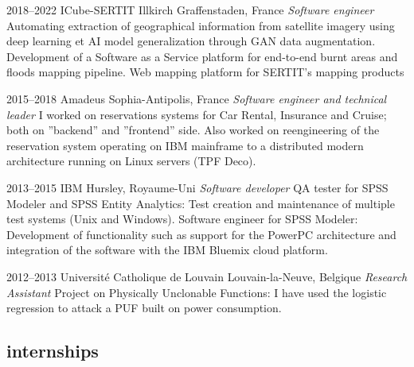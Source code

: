 \documentclass[]{friggeri-cv} %
\begin{document}
\begin{entrylist}



\entry
{2018--2022}
{ICube-SERTIT}
{Illkirch Graffenstaden, France}
{\emph{Software engineer}
\medbreak
Automating extraction of geographical information from satellite imagery
using deep learning et AI model generalization through GAN data augmentation.
\smallbreak
Development of a Software as a Service platform for end-to-end burnt areas
and floods mapping pipeline.
\smallbreak
Web mapping platform for SERTIT's mapping products
}

\entry
{2015--2018}
{Amadeus}
{Sophia-Antipolis, France}
{\emph{Software engineer and technical leader}
\medbreak
I worked on reservations systems for Car Rental, Insurance and Cruise; both
on ”backend” and ”frontend” side.
\smallbreak
Also worked on reengineering of the reservation system operating on IBM
mainframe to a distributed modern architecture running on Linux servers
(TPF Deco).
\bigbreak %
}

\entry
{2013--2015}
{IBM}
{Hursley, Royaume-Uni}
{\emph{Software developer}
\medbreak
QA tester for SPSS Modeler and SPSS Entity Analytics: Test creation and
maintenance of multiple test systems (Unix and Windows).
\smallbreak
Software engineer for SPSS Modeler: Development of functionality such as
support for the PowerPC architecture and integration of the software with
the IBM Bluemix cloud platform.
\bigbreak %
}

\entry
{2012--2013}
{Université Catholique de Louvain}
{Louvain-la-Neuve, Belgique}
{\emph{Research Assistant}
\medbreak
Project on Physically Unclonable Functions: I have used the logistic regression
to attack a PUF built on power consumption.
}

\end{entrylist}

\newpage

\subsection{internships}
\end{document}
